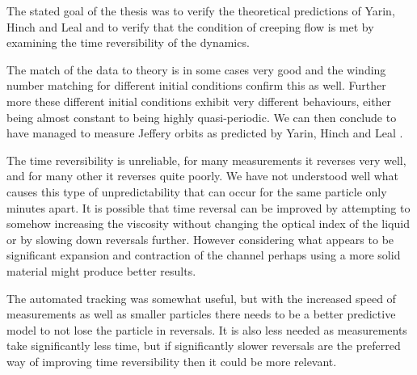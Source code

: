 The stated goal of the thesis was to verify the theoretical predictions of Yarin, Hinch and Leal \cite{Yarin, Leal} and 
to verify that the condition of creeping flow is met by examining the time reversibility of the dynamics. 

The match of the data to theory is in some cases very good and the winding number matching for different initial 
conditions confirm this as well. Further more these different initial conditions exhibit very different behaviours, 
either being almost constant to being highly quasi-periodic. We can then conclude to have managed to measure Jeffery 
orbits as predicted by Yarin, Hinch and Leal \cite{Yarin, Leal}. 

The time reversibility is unreliable, for many measurements it reverses very well, and for many other it reverses quite 
poorly. We have not understood well what causes this type of unpredictability that can occur for the same particle only 
minutes apart. It is possible that time reversal can be improved by attempting to somehow increasing the viscosity 
without changing the optical index of the liquid or by slowing down reversals further. However considering what appears 
to be significant expansion and contraction of the channel perhaps using a more solid material might produce better 
results. 

The automated tracking was somewhat useful, but with the increased speed of measurements as well as smaller particles 
there needs to be a better predictive model to not lose the particle in reversals. It is also less needed as 
measurements take significantly less time, but if significantly slower reversals are the preferred way of improving 
time reversibility then it could be more relevant. 